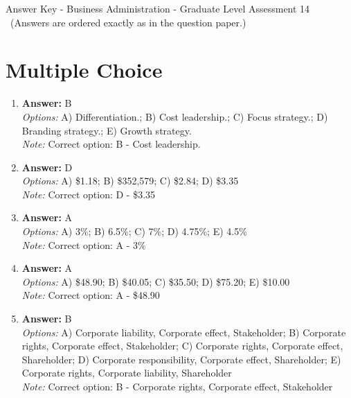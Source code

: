\documentclass[12pt]{article}
\begin{document}
\begin{center}
Answer Key - Business Administration - Graduate Level Assessment 14 \
\small (Answers are ordered exactly as in the question paper.)
\end{center}

\section*{Multiple Choice}
\begin{enumerate}[label=\arabic*.]
\item \textbf{Answer:} B
\\ \textit{Options:} A) Differentiation.; B) Cost leadership.; C) Focus strategy.; D) Branding strategy.; E) Growth strategy.
\\ \textit{Note:} Correct option: B - Cost leadership.
\item \textbf{Answer:} D
\\ \textit{Options:} A) \$1.18; B) \$352,579; C) \$2.84; D) \$3.35
\\ \textit{Note:} Correct option: D - \$3.35
\item \textbf{Answer:} A
\\ \textit{Options:} A) 3\%; B) 6.5\%; C) 7\%; D) 4.75\%; E) 4.5\%
\\ \textit{Note:} Correct option: A - 3\%
\item \textbf{Answer:} A
\\ \textit{Options:} A) \$48.90; B) \$40.05; C) \$35.50; D) \$75.20; E) \$10.00
\\ \textit{Note:} Correct option: A - \$48.90
\item \textbf{Answer:} B
\\ \textit{Options:} A) Corporate liability, Corporate effect, Stakeholder; B) Corporate rights, Corporate effect, Stakeholder; C) Corporate rights, Corporate effect, Shareholder; D) Corporate responsibility, Corporate effect, Shareholder; E) Corporate rights, Corporate liability, Shareholder
\\ \textit{Note:} Correct option: B - Corporate rights, Corporate effect, Stakeholder
\end{enumerate}
\end{document}
